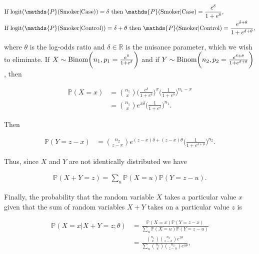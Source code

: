 \documentclass{homework}
\begin{document}
\begin{align*}
   & \textnormal{If } \textnormal{logit}(\mathds{P}(\textnormal{Smoker}|\textnormal{Case}))=\delta \textnormal{ then }\mathds{P}(\textnormal{Smoker}|\textnormal{Case}) =\frac{e^{\delta}}{1+e^{\delta}}, \\
   &\textnormal{If } \textnormal{logit}(\mathds{P}(\textnormal{Smoker}|\textnormal{Control}))=\delta + \theta \textnormal{ then }\mathds{P}(\textnormal{Smoker}|\textnormal{Control}) =\frac{e^{\delta+ \theta}}{1+e^{\delta+ \theta}},
\end{align*}

where $\theta$ is the log-odds ratio and $\delta \in \mathds{R}$ is the nuisance parameter, which we wish to eliminate. If $X \sim \textnormal{Binom}\bigg(n_1, p_1 = \frac{e^{\delta}}{1+e^{\delta}}\bigg)$ and if $Y \sim \textnormal{Binom}\bigg(n_2, p_2 = \frac{e^{\delta+ \theta}}{1+e^{\delta+ \theta}}\bigg)$, then 

\begin{align*}
\mathds{P}(X = x) &= {{n_1}\choose{x}} \bigg( \frac{e^{\delta}}{1+e^{\delta}}\bigg)^x\bigg( \frac{1}{1+e^{\delta}}\bigg)^{n_1-x} \\
&= {{n_1}\choose{x}} e^{x\delta} \bigg( \frac{1}{1+e^{\delta}}\bigg)^{n_1}.
\end{align*}

Then 

\begin{align*}
   \mathds{P}(Y = z-x) &=  {{n_2}\choose{z-x}} e^{(z-x)\delta+(z-x)\theta}\bigg( \frac{1}{1+e^{\delta+\theta}}\bigg)^{n_2}.
\end{align*}

Thus, since $X$ and $Y$ are not identically distributed we have 

\begin{align*}
    \mathds{P}(X+Y = z) = \sum_{u} \mathds{P}(X=u) \mathds{P}(Y=z-u).
\end{align*}

Finally, the probability that the random variable $X$ takes a particular value $x$ given that the sum of random variables $X+Y$ takes on a particular value $z$ is 

\begin{align*}
    \mathds{P}(X=x | X+Y = z; \theta) &= \frac{\mathds{P}(X=x)\mathds{P}(Y=z-x)}{\sum_{u}\mathds{P}(X=u)\mathds{P}(Y=z-u)} \\
    &= \frac{{{n_1}\choose{x}}{{n_2}\choose{z-x}}e^{x\theta}}{\sum_{u}{{n_1}\choose{u}}{{n_2}\choose{z-u}}e^{u\theta}},
\end{align*}
\end{document}
